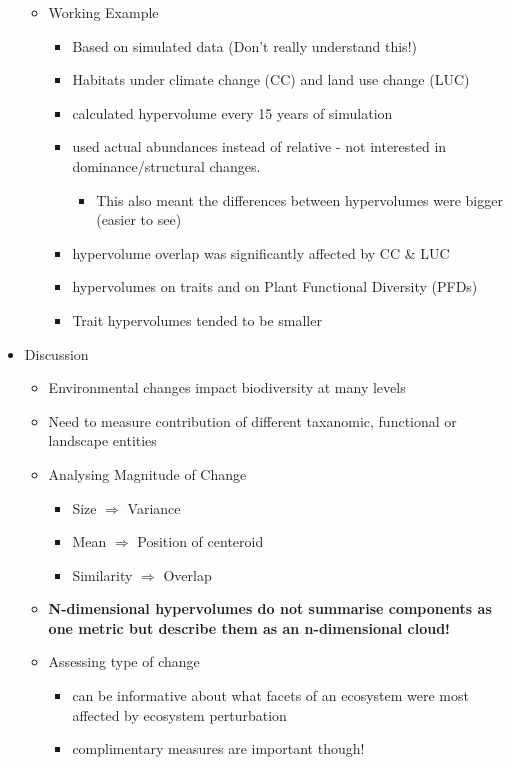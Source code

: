 \documentclass[11pt]{article}
\begin{document}
\begin{itemize}
\begin{itemize}
				 \item Working Example
				 \begin{itemize}
				 	\item Based on simulated data (Don't really understand this!)
				 	\item Habitats under climate change (CC) and land use change (LUC)
				 	\item calculated hypervolume every 15 years of simulation
				 	\item used actual abundances instead of relative - not interested in dominance/structural changes.
				 	\begin{itemize}
				 		\item This also meant the differences between hypervolumes were bigger (easier to see)
				 	\end{itemize}
				 	\item hypervolume overlap was significantly affected by CC \& LUC
				 	\item hypervolumes on traits and on Plant Functional Diversity (PFDs)
				 	\item Trait hypervolumes tended to be smaller
				 \end{itemize}
			\end{itemize}
					 
		\item Discussion 
		\begin{itemize}
			\item Environmental changes impact biodiversity at many levels
			\item Need to measure contribution of different taxanomic, functional or landscape entities
			
			\item Analysing Magnitude of Change
			\begin{itemize}
				\item Size $\Rightarrow$ Variance
				\item Mean $\Rightarrow$ Position of centeroid
				\item Similarity $\Rightarrow$ Overlap
			\end{itemize}
		
			\item \textbf{N-dimensional hypervolumes do not summarise components as one metric but describe them as an n-dimensional cloud!}
			
			\item Assessing type of change
			\begin{itemize}
				\item can be informative about what facets of an ecosystem were most affected by ecosystem perturbation
				\item complimentary measures are important though!
			\end{itemize}
		

\end{itemize}
\end{itemize}
\end{document}
